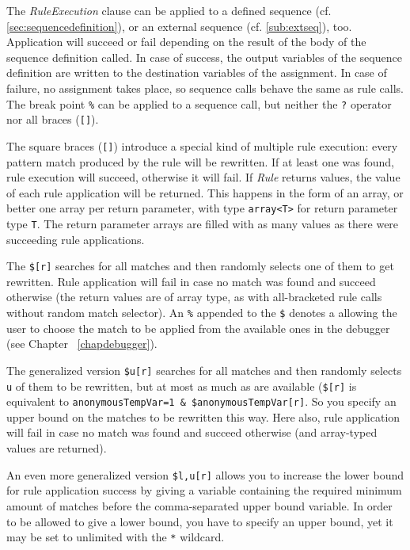 The \emph{RuleExecution} clause can be applied to a defined sequence (cf. \ref{sec:sequencedefinition}), or an external sequence (cf. \ref{sub:extseq}), too.
Application will succeed or fail depending on the result of the body of the sequence definition called.
In case of success, the output variables of the sequence definition are written to the destination variables of the assignment. In case of failure, no assignment takes place, so sequence calls behave the same as rule calls.
The break point \texttt{\%} can be applied to a sequence call, but neither the \texttt{?} operator nor all braces (\texttt{[]}).

The square braces (\texttt{[]}) introduce a special kind of multiple rule execution:
every pattern match produced by the rule will be rewritten.
If at least one was found, rule execution will succeed, otherwise it will fail. 
If \emph{Rule} returns values, the value of each rule application will be returned.
This happens in the form of an array, or better one array per return parameter, with type \verb#array<T># for return parameter type \verb#T#.
The return parameter arrays are filled with as many values as there were succeeding rule applications.

The  \texttt{\$[r]} searches for all matches and then randomly selects one of them to get rewritten. Rule application will fail in case no match was found and succeed otherwise (the return values are of array type, as with all-bracketed rule calls without random match selector). 
An \texttt{\%} appended to the \texttt{\$} denotes a  
allowing the user to choose the match to be applied from the available ones in the debugger (see Chapter ~\ref{chapdebugger}).

The generalized version \texttt{\$u[r]} searches for all matches and then randomly selects \texttt{u} of them to be rewritten, but at most as much as are available (\texttt{\$[r]} is equivalent to \texttt{anonymousTempVar=1 \& \$anonymousTempVar[r]}. So you specify an upper bound on the matches to be rewritten this way. Here also, rule application will fail in case no match was found and succeed otherwise (and array-typed values are returned).

An even more generalized version \texttt{\$l,u[r]} allows you to increase the lower bound for rule application success by giving a variable containing the required minimum amount of matches before the comma-separated upper bound variable.
In order to be allowed to give a lower bound, you have to specify an upper bound, yet it may be set to unlimited with the \texttt{*} wildcard.

